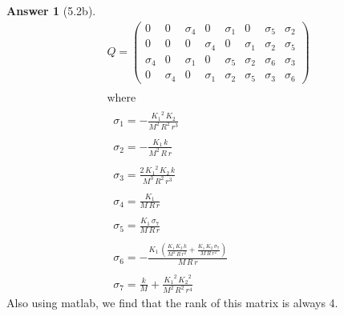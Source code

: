 \documentclass{article}
\theoremstyle{definition}
\newtheorem*{ans}{Answer}
\begin{document}
\begin{ans}[5.2b]

        \begin{equation*}
            \begin{array}{l}
            Q = 
                \left(\begin{array}{cccccccc}
                0 & 0 & \sigma_4  & 0 & \sigma_1  & 0 & \sigma_5  & \sigma_2 \\
                0 & 0 & 0 & \sigma_4  & 0 & \sigma_1  & \sigma_2  & \sigma_5 \\
                \sigma_4  & 0 & \sigma_1  & 0 & \sigma_5  & \sigma_2  & \sigma_6  & \sigma_3 \\
                0 & \sigma_4  & 0 & \sigma_1  & \sigma_2  & \sigma_5  & \sigma_3  & \sigma_6 
                \end{array}\right)\\
                \mathrm{}\\
                \textrm{where}\\
                \mathrm{}\\
                \;\;\sigma_1 =-\frac{{K_1 }^2 \,K_2 }{M^2 \,R^2 \,r^3 }\\
                \mathrm{}\\
                \;\;\sigma_2 =-\frac{K_1 \,k}{M^2 \,R\,r}\\
                \mathrm{}\\
                \;\;\sigma_3 =\frac{2\,{K_1 }^2 \,K_2 \,k}{M^3 \,R^2 \,r^3 }\\
                \mathrm{}\\
                \;\;\sigma_4 =\frac{K_1 }{M\,R\,r}\\
                \mathrm{}\\
                \;\;\sigma_5 =\frac{K_1 \,\sigma_7 }{M\,R\,r}\\
                \mathrm{}\\
                \;\;\sigma_6 =-\frac{K_1 \,{\left(\frac{K_1 \,K_2 \,k}{M^2 \,R\,r^2 }+\frac{K_1 \,K_2 \,\sigma_7 }{M\,R\,r^2 }\right)}}{M\,R\,r}\\
                \mathrm{}\\
                \;\;\sigma_7 =\frac{k}{M}+\frac{{K_1 }^2 \,{K_2 }^2 }{M^2 \,R^2 \,r^4 }
                \end{array}
        \end{equation*}
        Also using matlab, we find that the rank of this matrix is always 4.
    \end{ans}
\end{document}
